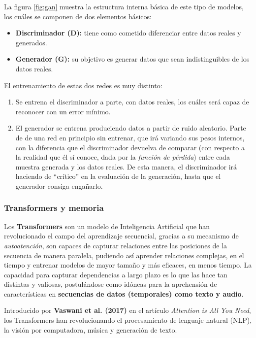 La figura \ref{fig:gan} muestra la estructura interna básica de este tipo de modelos, los cuáles se componen de dos elementos básicos:

\begin{itemize}
    \item \textbf{Discriminador (D):} tiene como cometido diferenciar entre datos reales y generados.
    \item \textbf{Generador (G):} su objetivo es generar datos que sean indistinguibles de los datos reales.
\end{itemize}

El entrenamiento de estas dos redes es muy distinto:
\begin{enumerate}
    \item Se entrena el discriminador a parte, con datos reales, los cuáles será capaz de reconocer con un error mínimo.
    \item El generador se entrena produciendo datos a partir de ruido aleatorio. Parte de de una red en principio sin entrenar, que irá variando sus pesos internos, con la diferencia que el discriminador devuelva de comparar (con respecto a la realidad que él sí conoce, dada por la \emph{función de pérdida}) entre cada muestra generada y los datos reales. De esta manera, el discriminador irá haciendo de ``crítico'' en la evaluación de la generación, hasta que el generador consiga engañarlo.
\end{enumerate}

\subsubsection{Transformers y memoria}

Los \textbf{Transformers} son un modelo de Inteligencia Artificial que han revolucionado el campo del aprendizaje secuencial, gracias a su mecanismo de \textit{autoatención}, son capaces de capturar relaciones entre las posiciones de la secuencia de manera paralela, pudiendo así aprender relaciones complejas, en el tiempo y entrenar modelos de mayor tamaño y más eficaces, en menos tiempo. La capacidad para capturar dependencias a largo plazo es lo que las hace tan distintas y valiosas, postulándose como idóneas para la aprehensión de características en \textbf{secuencias de datos (temporales) como texto y audio}.

Introducido por \textbf{Vaswani et al. (2017)} en el artículo \textit{Attention is All You Need}, los Transformers han revolucionando el procesamiento de lenguaje natural (NLP), la visión por computadora, música y generación de texto.

